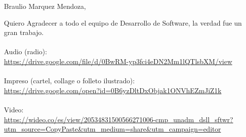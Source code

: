 \documentclass[fontsize=12pt, paper=a4]{scrlttr2}
\begin{document}
\begin{letter}{
Braulio Marquez Mendoza, \\
}

\opening{}  %
Quiero Agradecer a todo el equipo de Desarrollo de Software, la verdad fue un gran trabajo.\\
\\
Audio (radio): \\
\url{https://drive.google.com/file/d/0BwRM-yp3fci4eDN2Mm1lQTlsbXM/view }\\
\\
Impreso (cartel, collage o folleto ilustrado):  \\
\url{https://drive.google.com/open?id=0B6yzDltDxObjak1ONVhEZmJiZ1k }\\
\\
Video: \\
\url{https://wideo.co/es/view/20534831500566271006-cmp_unadm_dsll_sftwr?utm_source=CopyPaste&utm_medium=share&utm_campaign=editor }
\end{letter}
\end{document}

